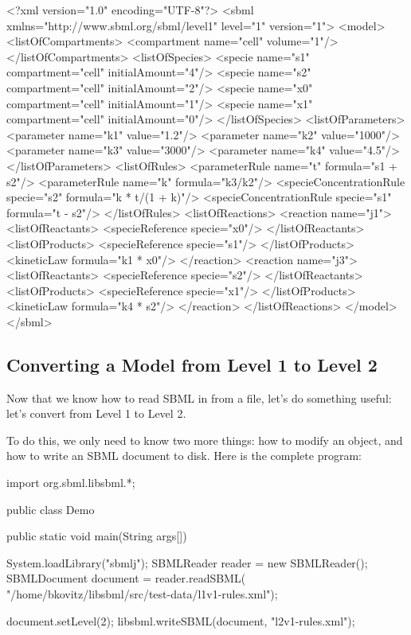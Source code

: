 \documentclass{sbmlmanual}
\begin{document}
\begin{boxedCodeVerbatim}
<?xml version="1.0" encoding="UTF-8"?>
<sbml xmlns="http://www.sbml.org/sbml/level1" level="1" version="1">
  <model>
    <listOfCompartments>
      <compartment name="cell" volume="1"/>
    </listOfCompartments>
    <listOfSpecies>
      <specie name="s1" compartment="cell" initialAmount="4"/>
      <specie name="s2" compartment="cell" initialAmount="2"/>
      <specie name="x0" compartment="cell" initialAmount="1"/>
      <specie name="x1" compartment="cell" initialAmount="0"/>
    </listOfSpecies>
    <listOfParameters>
      <parameter name="k1" value="1.2"/>
      <parameter name="k2" value="1000"/>
      <parameter name="k3" value="3000"/>
      <parameter name="k4" value="4.5"/>
    </listOfParameters>
    <listOfRules>
      <parameterRule name="t" formula="s1 + s2"/>
      <parameterRule name="k" formula="k3/k2"/>
      <specieConcentrationRule specie="s2" formula="k * t/(1 + k)"/>
      <specieConcentrationRule specie="s1" formula="t - s2"/>
    </listOfRules>
    <listOfReactions>
      <reaction name="j1">
        <listOfReactants>
          <specieReference specie="x0"/>
        </listOfReactants>
        <listOfProducts>
          <specieReference specie="s1"/>
        </listOfProducts>
        <kineticLaw formula="k1 * x0"/>
      </reaction>
      <reaction name="j3">
        <listOfReactants>
          <specieReference specie="s2"/>
        </listOfReactants>
        <listOfProducts>
          <specieReference specie="x1"/>
        </listOfProducts>
        <kineticLaw formula="k4 * s2"/>
      </reaction>
    </listOfReactions>
  </model>
</sbml>
\end{boxedCodeVerbatim}

\subsection{Converting a Model from Level 1 to Level 2}
\label{sec:simple-java-program}

Now that we know how to read SBML in from a file, let's do
something useful: let's convert  from Level 1
to Level 2.

To do this, we only need to know two more things: how to
modify an  object, and how to write an SBML document to
disk.  Here is the complete program:

\begin{boxedCodeVerbatim}
   import org.sbml.libsbml.*;

   public class Demo
   {
      public static void main(String args[])
      {
         System.loadLibrary("sbmlj");
         SBMLReader reader   = new SBMLReader();
         SBMLDocument document = reader.readSBML(
            "/home/bkovitz/libsbml/src/test-data/l1v1-rules.xml");

         document.setLevel(2);
         libsbml.writeSBML(document, "l2v1-rules.xml");
      }
   }
\end{boxedCodeVerbatim}
\end{document}
